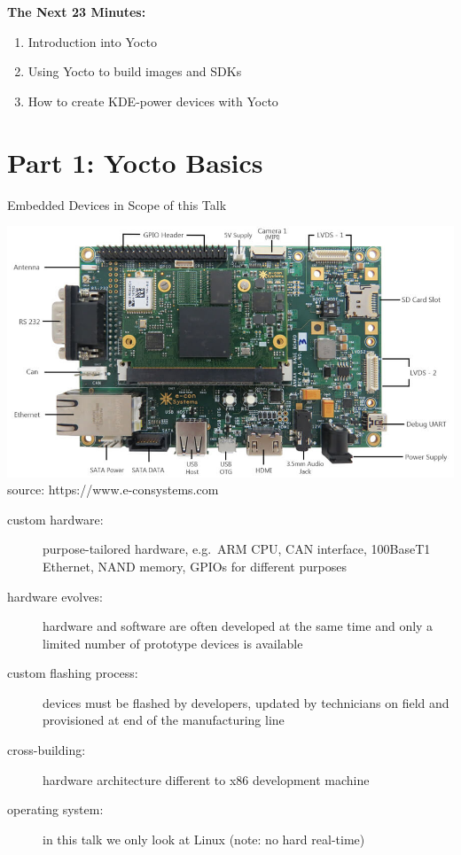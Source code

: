 \documentclass[ucs,9pt]{beamer}
\begin{document}
\begin{frame}
    \textbf{The Next 23 Minutes:}
    \begin{enumerate}
        \item Introduction into Yocto
        \item Using Yocto to build images and SDKs
        \item How to create KDE-power devices with Yocto
    \end{enumerate}
\end{frame}


\section{Part 1: Yocto Basics}

\begin{frame}
    {Embedded Devices in Scope of this Talk}

    \begin{center}
        \includegraphics[width=.5\paperwidth]{images/example-board}\\
        \tiny source: https://www.e-consystems.com
    \end{center}

    \begin{description}
        \item [custom hardware:] purpose-tailored hardware, e.g.\ ARM CPU, CAN interface, 100BaseT1 Ethernet, NAND memory, GPIOs for different purposes
        \item [hardware evolves:] hardware and software are often developed at the same time and only a limited number of prototype devices is available
        \item [custom flashing process:] devices must be flashed by developers, updated by technicians on field and provisioned at end of the manufacturing line
        \item [cross-building:] hardware architecture different to x86 development machine
        \item [operating system:] in this talk we only look at Linux (note: no hard real-time)
    \end{description}
\end{frame}
\end{document}

